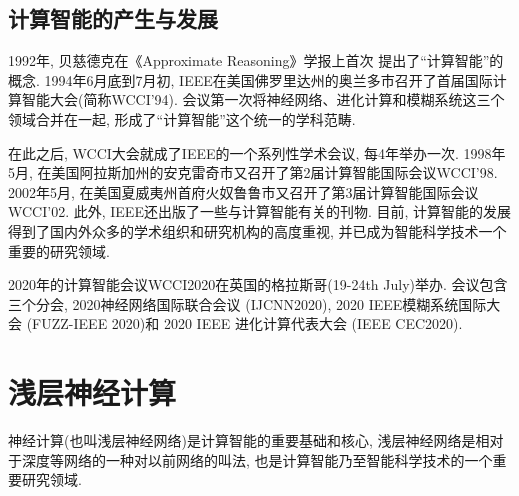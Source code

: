 \subsection{计算智能的产生与发展}
1992年, 贝慈德克在《Approximate Reasoning》学报上首次 提出了“计算智能”的概念.
%
%
1994年6月底到7月初, IEEE在美国佛罗里达州的奥兰多市召开了首届国际计算智能大会(简称WCCI'94). 会议第一次将神经网络、进化计算和模糊系统这三个领域合并在一起, 形成了“计算智能”这个统一的学科范畴.

在此之后, WCCI大会就成了IEEE的一个系列性学术会议, 每4年举办一次. 1998年5月, 在美国阿拉斯加州的安克雷奇市又召开了第2届计算智能国际会议WCCI’98.
2002年5月, 在美国夏威夷州首府火奴鲁鲁市又召开了第3届计算智能国际会议WCCI'02.
此外, IEEE还出版了一些与计算智能有关的刊物.
目前, 计算智能的发展得到了国内外众多的学术组织和研究机构的高度重视, 并已成为智能科学技术一个重要的研究领域.

2020年的计算智能会议WCCI2020在英国的格拉斯哥(19-24th July)举办. 会议包含三个分会, 2020神经网络国际联合会议 (IJCNN2020), 2020 IEEE模糊系统国际大会 (FUZZ-IEEE 2020)和 2020 IEEE 进化计算代表大会 (IEEE CEC2020).
\section{浅层神经计算}
神经计算(也叫浅层神经网络)是计算智能的重要基础和核心, 浅层神经网络是相对于深度等网络的一种对以前网络的叫法, 也是计算智能乃至智能科学技术的一个重要研究领域.

